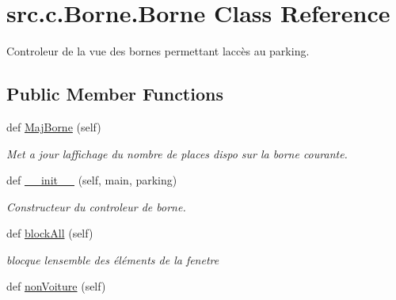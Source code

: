 \hypertarget{classsrc_1_1c_1_1_borne_1_1_borne}{}\section{src.\+c.\+Borne.\+Borne Class Reference}
\label{classsrc_1_1c_1_1_borne_1_1_borne}


Controleur de la vue des bornes permettant l\textquotesingle{}accès au parking.  


\subsection*{Public Member Functions}
\begin{DoxyCompactItemize}
\item 
\hypertarget{classsrc_1_1c_1_1_borne_1_1_borne_a481cebf281d635096daab1fe8952416c}{}def \hyperlink{classsrc_1_1c_1_1_borne_1_1_borne_a481cebf281d635096daab1fe8952416c}{Maj\+Borne} (self)\label{classsrc_1_1c_1_1_borne_1_1_borne_a481cebf281d635096daab1fe8952416c}

\begin{DoxyCompactList}\small\item\em Met a jour l\textquotesingle{}affichage du nombre de places dispo sur la borne courante. \end{DoxyCompactList}\item 
def \hyperlink{classsrc_1_1c_1_1_borne_1_1_borne_a6a5d51acd4d62eba9a8bc8f8e96a184f}{\+\_\+\+\_\+init\+\_\+\+\_\+} (self, main, parking)
\begin{DoxyCompactList}\small\item\em Constructeur du controleur de borne. \end{DoxyCompactList}\item 
\hypertarget{classsrc_1_1c_1_1_borne_1_1_borne_a41472289f777d3080aace7ba27dde85d}{}def \hyperlink{classsrc_1_1c_1_1_borne_1_1_borne_a41472289f777d3080aace7ba27dde85d}{block\+All} (self)\label{classsrc_1_1c_1_1_borne_1_1_borne_a41472289f777d3080aace7ba27dde85d}

\begin{DoxyCompactList}\small\item\em blocque l\textquotesingle{}ensemble des éléments de la fenetre \end{DoxyCompactList}\item 
\hypertarget{classsrc_1_1c_1_1_borne_1_1_borne_af4ce3e2e16639086237629a5ae055f62}{}def \hyperlink{classsrc_1_1c_1_1_borne_1_1_borne_af4ce3e2e16639086237629a5ae055f62}{non\+Voiture} (self)\label{classsrc_1_1c_1_1_borne_1_1_borne_af4ce3e2e16639086237629a5ae055f62}


\end{DoxyCompactItemize}
